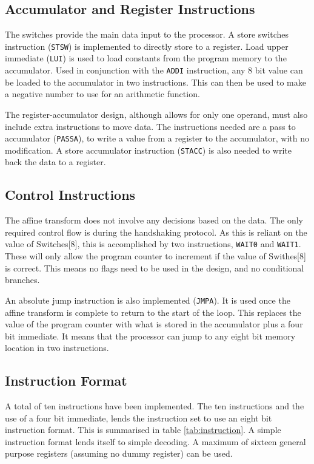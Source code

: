 \subsection{Accumulator and Register Instructions}

The switches provide the main data input to the processor. 
A store switches instruction (\texttt{STSW}) is implemented to directly store to a register. 
Load upper immediate (\texttt{LUI}) is used to load constants from the program memory to the accumulator. 
Used in conjunction with the \texttt{ADDI} instruction, any 8 bit value can be loaded to the accumulator in two instructions. 
This can then be used to make a negative number to use for an arithmetic function.

The register-accumulator design, although allows for only one operand, must also include extra instructions to move data.
The instructions needed are a pass to accumulator (\texttt{PASSA}), to write a value from a register to the accumulator, with no modification. 
A store accumulator instruction (\texttt{STACC}) is also needed to write back the data to a register. 

\subsection{Control Instructions}

The affine transform does not involve any decisions based on the data. 
The only required control flow is during the handshaking protocol. 
As this is reliant on the value of Switches[8], this is accomplished by two instructions, \texttt{WAIT0} and \texttt{WAIT1}. 
These will only allow the program counter to increment if the value of Swithes[8] is correct.
This means no flags need to be used in the design, and no conditional branches. 

An absolute jump instruction is also implemented (\texttt{JMPA}). 
It is used once the affine transform is complete to return to the start of the loop.
This replaces the value of the program counter with what is stored in the accumulator plus a four bit immediate. 
It means that the processor can jump to any eight bit memory location in two instructions.


\subsection{Instruction Format}

A total of ten instructions have been implemented. 
The ten instructions and the use of a four bit immediate, lends the instruction set to use an eight bit instruction format.
This is summarised in table \ref{tab:instruction}.
A simple instruction format lends itself to simple decoding. 
A maximum of sixteen general purpose registers (assuming no dummy register) can be used.

